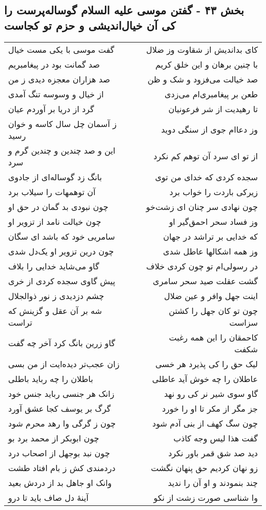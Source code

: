 \begin{center}
\section*{بخش ۴۳ - گفتن موسی علیه السلام گوساله‌پرست را کی آن خیال‌اندیشی و حزم تو کجاست}
\label{sec:sh043}
\begin{longtable}{l p{0.5cm} r}
گفت موسی با یکی مست خیال
&&
کای بداندیش از شقاوت وز ضلال
\\
صد گمانت بود در پیغامبریم
&&
با چنین برهان و این خلق کریم
\\
صد هزاران معجزه دیدی ز من
&&
صد خیالت می‌فزود و شک و ظن
\\
از خیال و وسوسه تنگ آمدی
&&
طعن بر پیغامبری‌ام می‌زدی
\\
گرد از دریا بر آوردم عیان
&&
تا رهیدیت از شر فرعونیان
\\
ز آسمان چل سال کاسه و خوان رسید
&&
وز دعاام جوی از سنگی دوید
\\
این و صد چندین و چندین گرم و سرد
&&
از تو ای سرد آن توهم کم نکرد
\\
بانگ زد گوساله‌ای از جادوی
&&
سجده کردی که خدای من توی
\\
آن توهمهات را سیلاب برد
&&
زیرکی باردت را خواب برد
\\
چون نبودی بد گمان در حق او
&&
چون نهادی سر چنان ای زشت‌خو
\\
چون خیالت نامد از تزویر او
&&
وز فساد سحر احمق‌گیر او
\\
سامریی خود که باشد ای سگان
&&
که خدایی بر تراشد در جهان
\\
چون درین تزویر او یک‌دل شدی
&&
وز همه اشکالها عاطل شدی
\\
گاو می‌شاید خدایی را بلاف
&&
در رسولی‌ام تو چون کردی خلاف
\\
پیش گاوی سجده کردی از خری
&&
گشت عقلت صید سحر سامری
\\
چشم دزدیدی ز نور ذوالجلال
&&
اینت جهل وافر و عین ضلال
\\
شه بر آن عقل و گزینش که تراست
&&
چون تو کان جهل را کشتن سزاست
\\
گاو زرین بانگ کرد آخر چه گفت
&&
کاحمقان را این همه رغبت شکفت
\\
زان عجب‌تر دیده‌ایت از من بسی
&&
لیک حق را کی پذیرد هر خسی
\\
باطلان را چه رباید باطلی
&&
عاطلان را چه خوش آید عاطلی
\\
زانک هر جنسی رباید جنس خود
&&
گاو سوی شیر نر کی رو نهد
\\
گرگ بر یوسف کجا عشق آورد
&&
جز مگر از مکر تا او را خورد
\\
چون ز گرگی وا رهد محرم شود
&&
چون سگ کهف از بنی آدم شود
\\
چون ابوبکر از محمد برد بو
&&
گفت هذا لیس وجه کاذب
\\
چون نبد بوجهل از اصحاب درد
&&
دید صد شق قمر باور نکرد
\\
دردمندی کش ز بام افتاد طشت
&&
زو نهان کردیم حق پنهان نگشت
\\
وانک او جاهل بد از دردش بعید
&&
چند بنمودند و او آن را ندید
\\
آینهٔ دل صاف باید تا درو
&&
وا شناسی صورت زشت از نکو
\\
\end{longtable}
\end{center}
